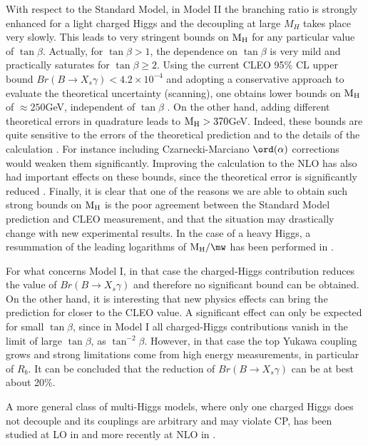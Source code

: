 With respect to the Standard Model, in Model II the branching ratio is
strongly enhanced for a light charged Higgs and the decoupling 
at large $M_H$ takes place very slowly.
 This leads to very stringent bounds on
${\rm M_H}$ for any 
particular value of $\tan\beta$.
Actually, for $\tan\beta>1$, the dependence on $\tan\beta$ is very mild
and practically saturates for $\tan \beta \ge 2$.
Using the current  CLEO 95\% CL upper bound 
$Br(B\to X_s\gamma) < 4.2 \times 10^{-4}$
and adopting a conservative approach to evaluate the theoretical uncertainty
(scanning), 
one obtains lower bounds on ${\rm M_H}$ of $\approx 250$GeV,
independent of $\tan\beta$ \cite{GAMB,BG98}.
On the other hand, 
adding different theoretical errors in quadrature leads to 
${\rm M_H}>370$GeV. 
Indeed, these bounds are quite sensitive to
the errors of the theoretical prediction and to the details of the
calculation \cite{GAMB}.
For instance including Czarnecki-Marciano $\ord({\alpha})$ corrections
would weaken them significantly.
 Improving the calculation to
the NLO has also had 
important effects on these bounds, since the theoretical error
is significantly reduced \cite{GAMB}.
Finally, it is  clear that
 one of the reasons we are  able to obtain such strong bounds on
${\rm M_H}$ is the poor agreement between the Standard Model prediction 
and CLEO measurement, and
that the situation may drastically change with new experimental results.
In the case of a heavy Higgs, 
a resummation of the leading logarithms of ${\rm M_H}/\mw$ has been 
performed in \cite{anl}.

For what concerns Model I, in that case 
the charged-Higgs contribution reduces the 
value of $Br(B\to X_s\gamma)$ and therefore no significant bound can be 
obtained. On
the other hand, it is interesting that new physics effects can
bring the prediction for \Bsg closer to the CLEO value. 
A significant effect can only be expected for small $\tan \beta$, since
in Model I all charged-Higgs contributions vanish in the limit of
large $\tan \beta$, as $\tan^{-2} \beta$. However, in that case the top Yukawa
coupling grows and strong limitations come from high energy measurements, in
particular of $R_b$. It can be concluded \cite{GAMB} that 
the reduction of $Br(B\to X_s\gamma)$  can be at best about 20{\%}. 

A more general class of multi-Higgs models, where only one charged Higgs does
not decouple and its couplings are arbitrary and may violate CP, 
 has been studied at LO in \cite{multiH}
and more recently at NLO in \cite{BG98}.

